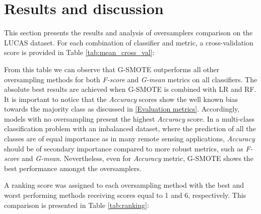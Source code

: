 \documentclass[remotesensing,article,submit,moreauthors,pdftex]{Definitions/mdpi}
\begin{document}
\section{Results and discussion}

This section presents the results and analysis of oversamplers comparison on the
LUCAS dataset. For each combination of classifier and metric, a cross-validation
score is provided in Table \ref{tab:mean_cross_val}:


From this table we can observe that G-SMOTE outperforms all other oversampling
methods for both \textit{F-score} and \textit{G-mean} metrics on all
classifiers. The absolute best results are achieved when G-SMOTE is combined
with LR and RF. It is important to notice that the \textit{Accuracy} scores show the well
known bias towards the majority class as discussed in \ref{Evaluation metrics}.
Accordingly, models with no oversampling present the highest \textit{Accuracy} score. In
a multi-class classification problem with an imbalanced dataset, where the
prediction of all the classes are of equal importance as in many remote sensing
applications, \textit{Accuracy} should be of secondary importance compared to more robust
metrics, such as \textit{F-score} and \textit{G-mean}. Nevertheless, even for
\textit{Accuracy} metric, G-SMOTE shows the best performance amongst the oversamplers.

A ranking score was assigned to each oversampling method with the best and worst
performing methods receiving scores equal to 1 and 6, respectively. This
comparison is presented in Table \ref{tab:ranking}:
\end{document}
